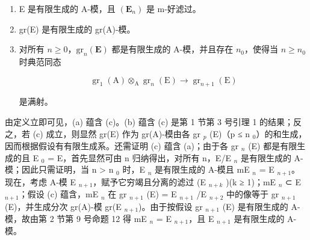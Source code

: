 \begin{enumerate}
\def\labelenumi{(\alph{enumi})}
\item
  E 是有限生成的 A-模，且 \((\mathbf{E}_{n})\) 是 m-好滤过。
\item
  gr(E) 是有限生成的 gr(A)-模。
\item
  对所有 \(n \geqslant 0\)，\(\mathrm{gr}_n(\mathbf{E})\) 都是有限生成的 A-模，并且存在 \(n_0\)，使得当 \(n \geqslant n_0\) 时典范同态

\[
\operatorname{gr} _ {1} (\mathrm{A}) \otimes_ {\mathrm{A}} \operatorname{gr} _ {n} (\mathrm{E}) \rightarrow \operatorname{gr} _ {n + 1} (\mathrm{E})\tag{3}
\]

是满射。
\end{enumerate}

由定义立即可见，(a) 蕴含 (c)。(b) 蕴含 (c) 是第 1 节第 3 号引理 1 的结果；反之，若 (c) 成立，则显然 gr(E) 作为 gr(A)-模由各 gr \(_{p}\) (E)（p ≤ n \(_{0}\)）的和生成，因而根据假设有有限生成系。还需证明 (c) 蕴含 (a)；由于各 gr \(_{n}\) (E) 都是有限生成的且 E \(_{0}\) = E，首先显然可由 n 归纳得出，对所有 n，E/E \(_{n}\) 是有限生成的 A-模；因此只需证明，当 n \textgreater{} n \(_{0}\) 时，E \(_{n}\) 是有限生成的 A-模且 mE \(_{n}\) = E \(_{n+1}\)。现在，考虑 A-模 E \(_{n+1}\)，赋予它穷竭且分离的滤过 (E \(_{n+k}\) )(k ≥ 1)；mE \(_{n}\) ⊂ E \(_{n+1}\)；假设 (c) 蕴含，mE \(_{n}\) 在 gr \(_{n+1}\) (E) = E \(_{n+1}\) /E \(_{n+2}\) 中的像等于 gr \(_{n+1}\) (E)，并生成分次 gr(A)-模 gr(E \(_{n+1}\))。由于按假设 gr \(_{n+1}\) (E) 是有限生成的 A-模，故由第 2 节第 9 号命题 12 得 mE \(_{n}\) = E \(_{n+1}\)，且 E \(_{n+1}\) 是有限生成的 A-模。


